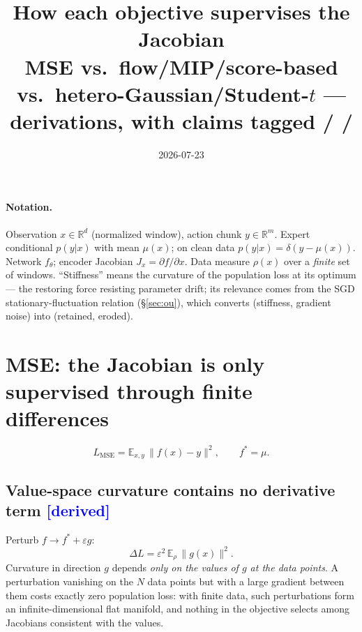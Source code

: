 \documentclass[10pt]{article}
\title{How each objective supervises the Jacobian\\
{\large MSE vs.\ flow/MIP/score-based vs.\ hetero-Gaussian/Student-$t$ ---
derivations, with claims tagged \tagd{} / \tagm{} / \tago}}
\date{2026-07-23}
\newcommand{\tagd}{{\small\textcolor{blue}{[derived]}}}
\begin{document}
\maketitle

\paragraph{Notation.} Observation $x \in \mathbb{R}^d$ (normalized window),
action chunk $y \in \mathbb{R}^m$. Expert conditional $p(y|x)$ with mean
$\mu(x)$; on clean data $p(y|x)=\delta(y-\mu(x))$. Network $f_\theta$; encoder
Jacobian $J_x = \partial f/\partial x$. Data measure $\rho(x)$ over a
\emph{finite} set of windows. ``Stiffness'' means the curvature of the
population loss at its optimum --- the restoring force resisting parameter
drift; its relevance comes from the SGD stationary-fluctuation relation
(\S\ref{sec:ou}), which converts (stiffness, gradient noise) into (retained,
eroded).

\section{MSE: the Jacobian is only supervised through finite differences}

\begin{equation}
L_{\mathrm{MSE}} = \mathbb{E}_{x,y}\,\|f(x)-y\|^2, \qquad f^{*}=\mu .
\end{equation}

\subsection{Value-space curvature contains no derivative term \hfill \tagd}
Perturb $f \to f^{*} + \varepsilon g$:
\begin{equation}
\Delta L = \varepsilon^{2}\,\mathbb{E}_{\rho}\,\|g(x)\|^{2}.
\end{equation}
Curvature in direction $g$ depends \emph{only on the values of $g$ at the data
points}. A perturbation vanishing on the $N$ data points but with a large
gradient between them costs exactly zero population loss: with finite data,
such perturbations form an infinite-dimensional flat manifold, and nothing in
the objective selects among Jacobians consistent with the values.
\end{document}
